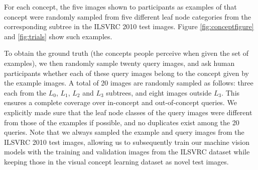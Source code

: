 For each concept, the five images shown to participants as examples of that concept were randomly sampled from five different leaf node categories from the corresponding subtree in the ILSVRC 2010 test images. Figure \ref{fig:conceptfigure} and \ref{fig:trials} show such examples.

To obtain the ground truth (the concepts people perceive when given the set of examples), we then randomly sample twenty query images, and ask human participants whether each of these query images belong to the concept given by the example images. A total of 20 images are randomly sampled as follows: three each from the $L_0$, $L_1$, $L_2$ and $L_3$ subtrees, and eight images outside $L_3$. This ensures a complete coverage over in-concept and out-of-concept queries. We explicitly made sure that the leaf node classes of the query images were different from those of the examples if possible, and no duplicates exist among the 20 queries. Note that we always sampled the example and query images from the ILSVRC 2010 test images, allowing us to subsequently train our machine vision models with the training and validation images from the ILSVRC dataset while keeping those in the visual concept learning dataset as novel test images.

